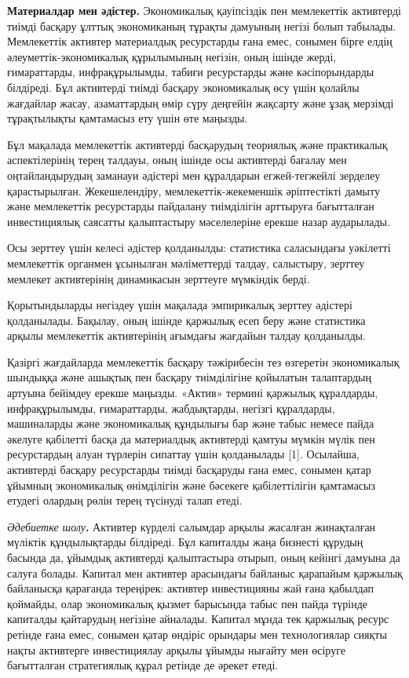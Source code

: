 {{\bfseries Материалдар мен әдістер.} Экономикалық қауіпсіздік пен
мемлекеттік активтерді тиімді басқару ұлттық экономиканың тұрақты
дамуының негізі болып табылады. Мемлекеттік активтер материалдық
ресурстарды ғана емес, сонымен бірге елдің әлеуметтік-экономикалық
құрылымының негізін, оның ішінде жерді, ғимараттарды, инфрақұрылымды,
табиғи ресурстарды және кәсіпорындарды білдіреді. Бұл активтерді тиімді
басқару экономикалық өсу үшін қолайлы жағдайлар жасау, азаматтардың өмір
сүру деңгейін жақсарту және ұзақ мерзімді тұрақтылықты қамтамасыз ету
үшін өте маңызды.

Бұл мақалада мемлекеттік активтерді басқарудың теориялық және
практикалық аспектілерінің терең талдауы, оның ішінде осы активтерді
бағалау мен оңтайландырудың заманауи әдістері мен құралдарын
егжей-тегжейлі зерделеу қарастырылған. Жекешелендіру,
мемлекеттік-жекеменшік әріптестікті дамыту және мемлекеттік ресурстарды
пайдалану тиімділігін арттыруға бағытталған инвестициялық саясатты
қалыптастыру мәселелеріне ерекше назар аударылады.

Осы зерттеу үшін келесі әдістер қолданылды: статистика саласындағы
уәкілетті мемлекеттік органмен ұсынылған мәліметтерді талдау, салыстыру,
зерттеу мемлекет активтерінің динамикасын зерттеуге мүмкіндік берді.

Қорытындыларды негіздеу үшін мақалада эмпирикалық зерттеу әдістері
қолданылады. Бақылау, оның ішінде қаржылық есеп беру және статистика
арқылы мемлекеттік активтерінің ағымдағы жағдайын талдау қолданылды.

Қазіргі жағдайларда мемлекеттік басқару тәжірибесін тез өзгеретін
экономикалық шындыққа және ашықтық пен басқару тиімділігіне қойылатын
талаптардың артуына бейімдеу ерекше маңызды. «Актив» термині қаржылық
құралдарды, инфрақұрылымды, ғимараттарды, жабдықтарды, негізгі
құралдарды, машиналарды және экономикалық құндылығы бар және табыс
немесе пайда әкелуге қабілетті басқа да материалдық активтерді қамтуы
мүмкін мүлік пен ресурстардың алуан түрлерін сипаттау үшін қолданылады
{[}1{]}. Осылайша, активтерді басқару ресурстарды тиімді басқаруды ғана
емес, сонымен қатар ұйымның экономикалық өнімділігін және бәсекеге
қабілеттілігін қамтамасыз етудегі олардың рөлін терең түсінуді талап
етеді.

\emph{Әдебиетке шолу}{\bfseries .} Активтер күрделі салымдар арқылы
жасалған жинақталған мүліктік құндылықтарды білдіреді. Бұл капиталды
жаңа бизнесті құрудың басында да, ұйымдық активтерді қалыптастыра
отырып, оның кейінгі дамуына да салуға болады. Капитал мен активтер
арасындағы байланыс қарапайым қаржылық байланысқа қарағанда тереңірек:
активтер инвестицияны жай ғана қабылдап қоймайды, олар экономикалық
қызмет барысында табыс пен пайда түрінде капиталды қайтарудың негізіне
айналады. Капитал мұнда тек қаржылық ресурс ретінде ғана емес, сонымен
қатар өндіріс орындары мен технологиялар сияқты нақты активтерге
инвестициялау арқылы ұйымды нығайту мен өсіруге бағытталған стратегиялық
құрал ретінде де әрекет етеді.

}
